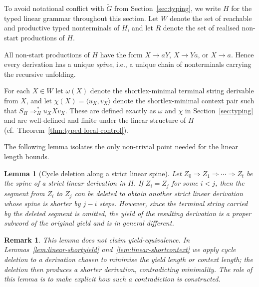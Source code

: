 \documentclass[11pt,a4paper]{article}
\newtheorem{lemma}[theorem]{Lemma}
\newtheorem{remark}[theorem]{Remark}
\begin{document}
To avoid notational conflict with $\widetilde G$ from Section~\ref{sec:typing},
we write $H$ for the typed linear grammar throughout this section.
Let $W$ denote the set of reachable and productive typed nonterminals of $H$,
and let $R$ denote the set of realised non-start productions of $H$.

All non-start productions of $H$ have the form $X\to aY$, $X\to Ya$, or $X\to a$.
Hence every derivation has a unique \emph{spine}, i.e., a unique chain of nonterminals
carrying the recursive unfolding.

For each $X\in W$ let $\omega(X)$ denote the shortlex-minimal terminal string
derivable from $X$, and let $\chi(X)=\langle u_X,v_X\rangle$ denote the
shortlex-minimal context pair such that $S_H\Rightarrow_H^* u_XXv_X$.
These are defined exactly as $\omega$ and $\chi$ in Section~\ref{sec:typing}
and are well-defined and finite under the linear structure of $H$
(cf.\ Theorem~\ref{thm:typed-local-control}).

The following lemma isolates the only non-trivial point needed for the linear length bounds.

\begin{lemma}[Cycle deletion along a strict linear spine]
\label{lem:linear-cycle-delete}
Let $Z_0\Rightarrow Z_1\Rightarrow\cdots\Rightarrow Z_t$ be the spine of a strict linear
derivation in $H$.
If $Z_i=Z_j$ for some $i<j$, then the segment from $Z_i$ to $Z_j$ can be deleted
to obtain another strict linear derivation whose spine is shorter by $j-i$ steps.
However, since the terminal string carried by the deleted segment is omitted,
the yield of the resulting derivation is a proper subword of the original yield
and is in general different.
\end{lemma}

\begin{remark}
This lemma does not claim yield-equivalence.
In Lemmas~\ref{lem:linear-shortyield} and~\ref{lem:linear-shortcontext} we apply
cycle deletion to a derivation chosen to minimise the yield length or context length;
the deletion then produces a shorter derivation, contradicting minimality.
The role of this lemma is to make explicit how such a contradiction is constructed.
\end{remark}
\end{document}
